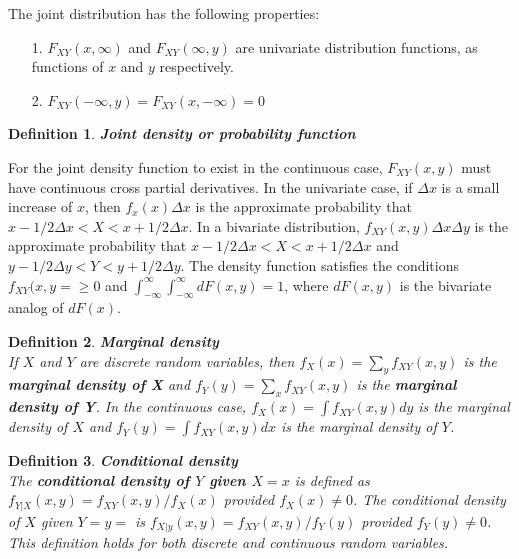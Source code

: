 \documentclass{article}
\newtheorem{definition}{Definition}[section]
\begin{document}
The joint distribution has the following properties:
\begin{itemize}
    \item [1.] \(F_{XY} (x,\infty)\) and \(F_{XY}(\infty,y)\) are univariate distribution functions, as functions of \(x\) and \(y\) respectively.
    \item[2.] \(F_{XY}(-\infty,y)=F_{XY}(x,-\infty)=0\) 
\end{itemize}

\begin{definition} \textbf{Joint density or probability function} \\
\end{definition}

For the joint density function to exist in the continuous case, \(F_{XY}(x,y)\) must have continuous cross partial derivatives. In the univariate case, if \(\Delta x\) is a small increase of \(x\), then \(f_x(x)\Delta x\) is the approximate probability that \(x-1/2 \Delta x < X < x+1/2 \Delta x\). In a bivariate distribution, \( f_{XY}(x,y)\Delta x \Delta y\) is the approximate probability that \(x-1/2 \Delta x < X < x+1/2 \Delta x\) and \(y-1/2 \Delta y < Y < y+1/2 \Delta y\). The density function satisfies the conditions \(f_{XY} (x,y= \geq 0\) and \(\int_{-\infty}^{\infty} \int_{-\infty}^{\infty} dF(x,y)=1\), where \(dF(x,y)\) is the bivariate analog of \(dF(x)\).


\begin{definition} \textbf{Marginal density} \\
    If \(X\) and \(Y\) are discrete random variables, then \(f_X(x)=\sum_y f_{XY}(x,y)\) is the \textbf{marginal density of X} and \(f_Y(y)=\sum_x f_{XY}(x,y)\) is the \textbf{marginal density of Y}. In the continuous case, \(f_X(x)=\int f_{XY}(x,y)dy\) is the marginal density of \(X\) and \(f_Y(y)=\int f_{XY}(x,y)dx\) is the marginal density of \(Y\).
\end{definition}

\begin{definition} \textbf{Conditional density} \\
    The \textbf{conditional density of \(Y\) given \(X=x\)} is defined as \(f_{Y|X} (x,y)=f_{XY}(x,y)/f_X(x)\) provided \(f_X(x) \neq 0\). The conditional density of \(X\) given \(Y=y=\) is \(f_{X|y} (x,y)=f_{XY}(x,y)/f_Y(y)\) provided \(f_Y(y) \neq 0\). This definition holds for both discrete and continuous random variables.
\end{definition} 
\end{document}
